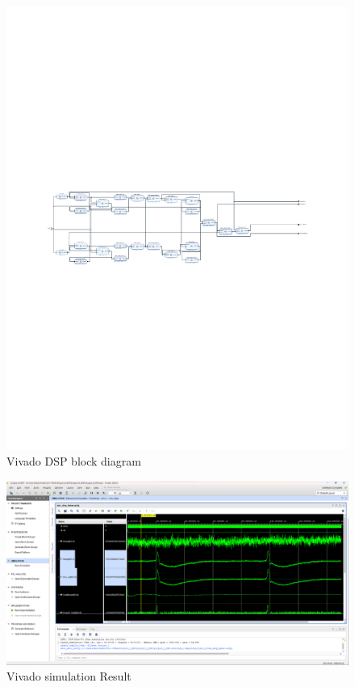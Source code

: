 \begin{landscape}\centering
\vspace*{\fill}
\begin{figure}[h]
\centering
\includegraphics[width=1\linewidth]{4-ANC_Sys/VivadoBD_DSP.pdf}
\caption{Vivado DSP block diagram}
\label{fig_VivadoBD_DSP}
\end{figure}
\vfill
\end{landscape}

\begin{figure}[h]
\centering
\includegraphics[width=1\linewidth]{4-ANC_Sys/VivadoSim.png}
\caption{Vivado simulation Result}
\label{fig_VivadoSimResult}
\end{figure}



